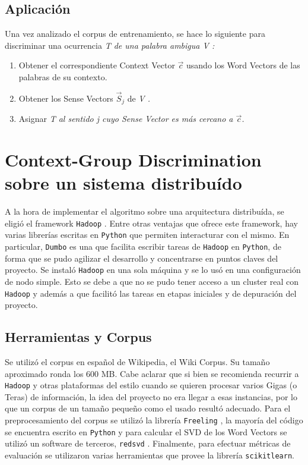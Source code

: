 \documentclass[11pt]{article}
\begin{document}
\subsection{Aplicación}
Una vez analizado el corpus de entrenamiento, se hace lo siguiente para discriminar una ocurrencia \em T \em de una palabra ambigua \em V \em:
\begin{enumerate}
\item Obtener el correspondiente Context Vector $\vec c$ usando los Word Vectors de las palabras de su contexto.
\item Obtener los Sense Vectors $\vec S_j$ de \em V \em.
\item Asignar \em T \em al sentido \em j \em cuyo Sense Vector es más cercano a $\vec c$.
\end{enumerate}

\section{Context-Group Discrimination sobre un sistema distribuído}
A la hora de implementar el algoritmo sobre una arquitectura distribuída, se eligió el framework \texttt{Hadoop} \cite{Had}.
Entre otras ventajas que ofrece este framework, hay varias librerías escritas en \texttt{Python} que permiten interacturar con el mismo. En particular, \texttt{Dumbo} \cite{Dum} es una que facilita escribir tareas de \texttt{Hadoop} en \texttt{Python}, de forma que se pudo agilizar el desarrollo y concentrarse en puntos claves del proyecto.
Se instaló \texttt{Hadoop} en una sola máquina y se lo usó en una configuración de nodo simple. Esto se debe a que no se pudo tener acceso a un cluster real con \texttt{Hadoop} y además a que facilitó las tareas en etapas iniciales y de depuración del proyecto.


\subsection{Herramientas y Corpus}
Se utilizó el corpus en español de Wikipedia, el Wiki Corpus. Su tamaño aproximado ronda los 600 MB.
Cabe aclarar que si bien se recomienda recurrir a \texttt{Hadoop} y otras plataformas del estilo cuando se quieren procesar varios Gigas (o Teras) de información, la idea del proyecto no era llegar a esas instancias, por lo que un corpus de un tamaño pequeño como el usado resultó adecuado.
Para el preprocesamiento del corpus se utilizó la librería \texttt{Freeling} \cite{Free}, la mayoría del código se encuentra escrito en \texttt{Python} y para calcular el SVD de los Word Vectors se utilizó un software de terceros, \texttt{redsvd} \cite{Red}.
Finalmente, para efectuar métricas de evaluación se utilizaron varias herramientas que provee la librería \texttt{scikitlearn}.
\end{document}
